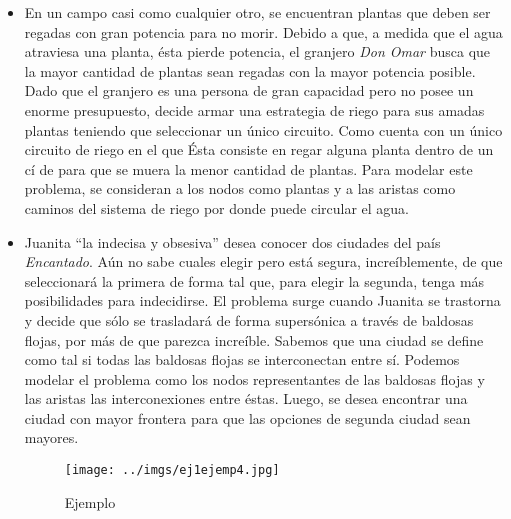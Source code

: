 \begin{itemize}
\item En un campo casi como cualquier otro, se encuentran plantas que deben ser regadas con gran potencia para no morir. Debido a que, a medida que el agua atraviesa una planta, ésta pierde potencia, el granjero \textit{Don Omar} busca que la mayor cantidad de plantas sean regadas con la mayor potencia posible. Dado que el granjero es una persona de gran capacidad pero no posee un enorme presupuesto, decide armar una estrategia de riego para sus amadas plantas teniendo que seleccionar un único circuito. Como cuenta con un único circuito de riego en el que Ésta consiste en regar alguna planta dentro de un cí de para que se muera la menor cantidad de plantas. Para modelar este problema, se consideran a los nodos como plantas y a las aristas como caminos del sistema de riego por donde puede circular el agua. %

\item Juanita ``la indecisa y obsesiva'' desea conocer dos ciudades del país \textit{Encantado}. Aún no sabe cuales elegir pero está segura, increíblemente, de que seleccionará la primera de forma tal que, para elegir la segunda, tenga más posibilidades para indecidirse. El problema surge cuando Juanita se trastorna y decide que sólo se trasladará de forma supersónica a través de baldosas flojas, por más de que parezca increíble. Sabemos que una ciudad se define como tal si todas las baldosas flojas se interconectan entre sí. Podemos modelar el problema como los nodos representantes de las baldosas flojas y las aristas las interconexiones entre éstas. Luego, se desea encontrar una ciudad con mayor frontera para que las opciones de segunda ciudad sean mayores.

\begin{figure}[H] %
\begin{center}
\texttt{[image: ../imgs/ej1ejemp4.jpg]}
\caption{Ejemplo}
\end{center}
\end{figure}

\end{itemize}

